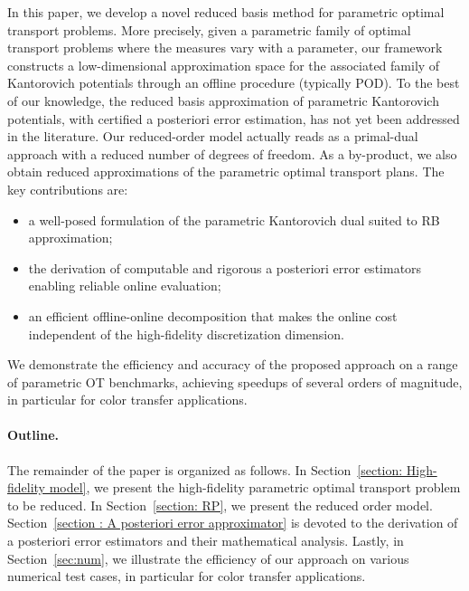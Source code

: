 \documentclass{article}
\begin{document}
In this paper, we develop a novel reduced basis method for parametric optimal transport problems. More precisely, given a parametric family of optimal transport problems where the measures vary with a parameter, our framework constructs a low-dimensional approximation space for the associated family of Kantorovich potentials through an offline procedure (typically POD).  To the best of our knowledge, the reduced basis approximation of parametric Kantorovich potentials, with certified a posteriori error estimation, has not yet been addressed in the literature.  Our reduced-order model actually reads as a primal-dual approach with a reduced number of degrees of freedom. As a by-product, we also obtain reduced approximations of the parametric optimal transport plans.  The key contributions are: 
\begin{itemize}
    \item[(i)] a well-posed formulation of the parametric Kantorovich dual suited to RB approximation; 
    \item [(ii)] the derivation of computable and rigorous a posteriori error estimators enabling reliable online evaluation;
    \item[(iii)] an efficient offline-online decomposition that makes the online cost independent of the high-fidelity discretization dimension. 
\end{itemize}
   We demonstrate the efficiency and accuracy of the proposed approach on a range of parametric OT benchmarks, achieving speedups of several orders of magnitude, in particular for color transfer applications.


\paragraph{Outline.}
The remainder of the paper is organized as follows. In Section~\ref{section: High-fidelity model}, we present the high-fidelity parametric optimal transport problem to be reduced. In Section~\ref{section: RP}, we present the reduced order model. Section~\ref{section : A posteriori error approximator} is devoted to the derivation of a posteriori error estimators and their mathematical analysis. Lastly, in Section~\ref{sec:num}, we illustrate the efficiency of our approach on various numerical test cases, in particular for color transfer applications. 


\end{document}
